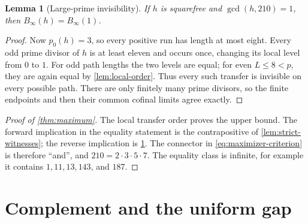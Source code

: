 \documentclass[12pt,a4paper]{article}
\newtheorem{lemma}[theorem]{Lemma}
\theoremstyle{definition}
\newcommand{\Bin}{B_\infty}
\begin{document}
\begin{lemma}[Large-prime invisibility]
\label{lem:invisibility}
If \(h\) is squarefree and \(\gcd(h,210)=1\), then \(\Bin(h)=\Bin(1)\).
\end{lemma}

\begin{proof}
Now \(p_0(h)=3\), so every positive run has length at most eight.  Every odd
prime divisor of \(h\) is at least eleven and occurs once, changing its local
level from \(0\) to \(1\).  For odd path lengths the two levels are equal; for
even \(L\leq8<p\), they are again equal by \cref{lem:local-order}.  Thus every
such transfer is invisible on every possible path.  There are only finitely
many prime divisors, so the finite endpoints and then their common cofinal
limits agree exactly.
\end{proof}

\begin{proof}[Proof of \cref{thm:maximum}]
The local transfer order proves the upper bound.  The forward implication in
the equality statement is the contrapositive of
\cref{lem:strict-witnesses}; the reverse implication is
\cref{lem:invisibility}.  The connector in
\eqref{eq:maximizer-criterion} is therefore ``and'', and
\(210=2\cdot3\cdot5\cdot7\).  The equality class is infinite, for example it
contains \(1,11,13,143\), and \(187\).
\end{proof}

\section{Complement and the uniform gap}
\end{document}
